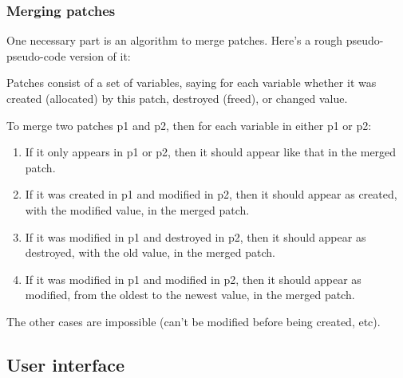 \documentclass[a4paper]{report}
\begin{document}
\subsubsection{Merging patches}
One necessary part is an algorithm to merge patches. Here's a rough pseudo-pseudo-code version of it:
\par
Patches consist of a set of variables, saying for each variable whether it was created (allocated) by this patch, destroyed (freed), or changed value.
\par
To merge two patches p1 and p2, then for each variable in either p1 or p2:
\par
\begin{enumerate}
\item If it only appears in p1 or p2, then it should appear like that in the merged patch.
\item If it was created in p1 and modified in p2, then it should appear as created, with the modified value, in the merged patch.
\item If it was modified in p1 and destroyed in p2, then it should appear as destroyed, with the old value, in the merged patch.
\item If it was modified in p1 and modified in p2, then it should appear as modified, from the oldest to the newest value, in the merged patch. 
\end{enumerate}
\par
The other cases are impossible (can't be modified before being created, etc). 
\subsection{User interface}






\appendix



\end{document}
